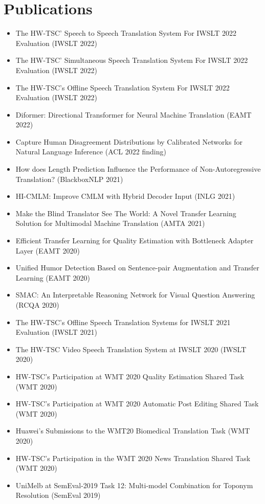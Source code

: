 \documentclass{resume_en}
\begin{document}
\section{Publications}
\begin{itemize}[parsep=0.2ex]
  \item The HW-TSC’ Speech to Speech Translation System For IWSLT 2022 Evaluation (IWSLT 2022)
  \item The HW-TSC’ Simultaneous Speech Translation System For IWSLT 2022 Evaluation (IWSLT 2022)
  \item The HW-TSC’s Offline Speech Translation System For IWSLT 2022 Evaluation (IWSLT 2022)
  \item Diformer: Directional Transformer for Neural Machine Translation (EAMT 2022)
  \item Capture Human Disagreement Distributions by Calibrated Networks for Natural Language Inference (ACL 2022 finding)
  \item How does Length Prediction Influence the Performance of Non-Autoregressive Translation? (BlackboxNLP 2021)
  \item HI-CMLM: Improve CMLM with Hybrid Decoder Input (INLG 2021)
  \item Make the Blind Translator See The World: A Novel Transfer Learning Solution for Multimodal Machine Translation (AMTA 2021)
  \item Efficient Transfer Learning for Quality Estimation with Bottleneck Adapter Layer (EAMT 2020)
  \item Unified Humor Detection Based on Sentence-pair Augmentation and Transfer Learning (EAMT 2020)
  \item SMAC: An Interpretable Reasoning Network for Visual Question Answering (RCQA 2020)
  \item The HW-TSC's Offline Speech Translation Systems for IWSLT 2021 Evaluation (IWSLT 2021)
  \item The HW-TSC Video Speech Translation System at IWSLT 2020 (IWSLT 2020)
  \item HW-TSC's Participation at WMT 2020 Quality Estimation Shared Task (WMT 2020)
  \item HW-TSC's Participation at WMT 2020 Automatic Post Editing Shared Task (WMT 2020)
  \item Huawei's Submissions to the WMT20 Biomedical Translation Task (WMT 2020)
  \item HW-TSC's Participation in the WMT 2020 News Translation Shared Task (WMT 2020)
  \item UniMelb at SemEval-2019 Task 12: Multi-model Combination for Toponym Resolution (SemEval 2019)
\end{itemize}
\end{document}
